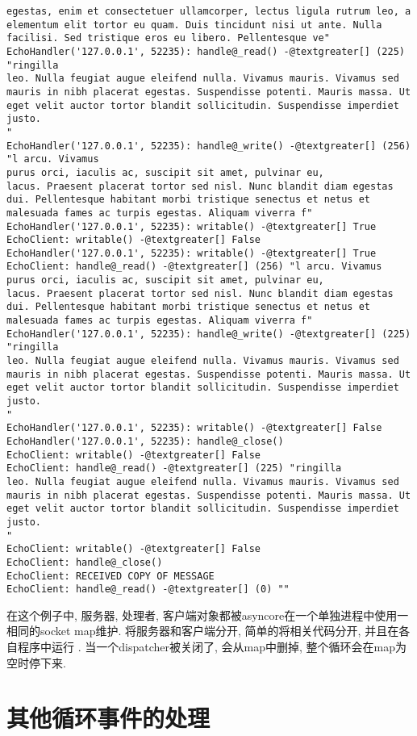 \documentclass[a4paper,10pt,english]{manual}
\begin{document}
\begin{Verbatim}[commandchars=@\[\]]
egestas, enim et consectetuer ullamcorper, lectus ligula rutrum leo, a
elementum elit tortor eu quam. Duis tincidunt nisi ut ante. Nulla
facilisi. Sed tristique eros eu libero. Pellentesque ve"
EchoHandler('127.0.0.1', 52235): handle@_read() -@textgreater[] (225) "ringilla
leo. Nulla feugiat augue eleifend nulla. Vivamus mauris. Vivamus sed
mauris in nibh placerat egestas. Suspendisse potenti. Mauris massa. Ut
eget velit auctor tortor blandit sollicitudin. Suspendisse imperdiet
justo.
"
EchoHandler('127.0.0.1', 52235): handle@_write() -@textgreater[] (256) "l arcu. Vivamus
purus orci, iaculis ac, suscipit sit amet, pulvinar eu,
lacus. Praesent placerat tortor sed nisl. Nunc blandit diam egestas
dui. Pellentesque habitant morbi tristique senectus et netus et
malesuada fames ac turpis egestas. Aliquam viverra f"
EchoHandler('127.0.0.1', 52235): writable() -@textgreater[] True
EchoClient: writable() -@textgreater[] False
EchoHandler('127.0.0.1', 52235): writable() -@textgreater[] True
EchoClient: handle@_read() -@textgreater[] (256) "l arcu. Vivamus
purus orci, iaculis ac, suscipit sit amet, pulvinar eu,
lacus. Praesent placerat tortor sed nisl. Nunc blandit diam egestas
dui. Pellentesque habitant morbi tristique senectus et netus et
malesuada fames ac turpis egestas. Aliquam viverra f"
EchoHandler('127.0.0.1', 52235): handle@_write() -@textgreater[] (225) "ringilla
leo. Nulla feugiat augue eleifend nulla. Vivamus mauris. Vivamus sed
mauris in nibh placerat egestas. Suspendisse potenti. Mauris massa. Ut
eget velit auctor tortor blandit sollicitudin. Suspendisse imperdiet
justo.
"
EchoHandler('127.0.0.1', 52235): writable() -@textgreater[] False
EchoHandler('127.0.0.1', 52235): handle@_close()
EchoClient: writable() -@textgreater[] False
EchoClient: handle@_read() -@textgreater[] (225) "ringilla
leo. Nulla feugiat augue eleifend nulla. Vivamus mauris. Vivamus sed
mauris in nibh placerat egestas. Suspendisse potenti. Mauris massa. Ut
eget velit auctor tortor blandit sollicitudin. Suspendisse imperdiet
justo.
"
EchoClient: writable() -@textgreater[] False
EchoClient: handle@_close()
EchoClient: RECEIVED COPY OF MESSAGE
EchoClient: handle@_read() -@textgreater[] (0) ""
\end{Verbatim}

在这个例子中, 服务器, 处理者, 客户端对象都被asyncore在一个单独进程中使用一相同的socket map维护. 将服务器和客户端分开, 简单的将相关代码分开, 并且在各自程序中运行 . 当一个dispatcher被关闭了, 会从map中删掉, 整个循环会在map为空时停下来.


\section{其他循环事件的处理}
\end{document}
